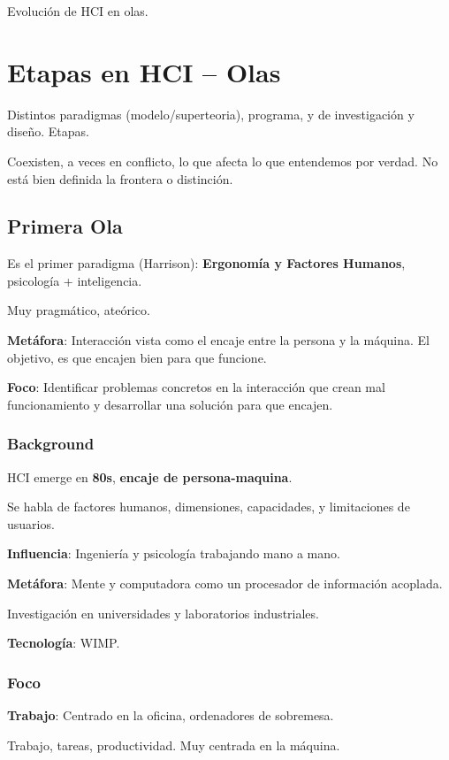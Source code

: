 \documentclass[12pt]{report} %
\begin{document}
Evolución de HCI en olas.

\section{Etapas en HCI -- Olas}

Distintos paradigmas (modelo/superteoria), programa, y de investigación
y diseño. Etapas.

Coexisten, a veces en conflicto, lo que afecta lo que entendemos por
verdad. No está bien definida la frontera o distinción.

\subsection{Primera Ola}

Es el primer paradigma (Harrison): \textbf{Ergonomía y Factores
Humanos}, psicología + inteligencia.

Muy pragmático, ateórico.

\textbf{Metáfora}: Interacción vista como el encaje entre la persona y
la máquina. El objetivo, es que encajen bien para que funcione.

\textbf{Foco}: Identificar problemas concretos en la interacción que
crean mal funcionamiento y desarrollar una solución para que encajen.

\subsubsection{Background}

HCI emerge en \textbf{80s}, \textbf{encaje de persona-maquina}.

Se habla de factores humanos, dimensiones, capacidades, y limitaciones
de usuarios.

\textbf{Influencia}: Ingeniería y psicología trabajando mano a mano.

\textbf{Metáfora}: Mente y computadora como un procesador de información
acoplada.

Investigación en universidades y laboratorios industriales.

\textbf{Tecnología}: WIMP.

\subsubsection{Foco}

\textbf{Trabajo}: Centrado en la oficina, ordenadores de sobremesa.

Trabajo, tareas, productividad. Muy centrada en la máquina.
\end{document}
